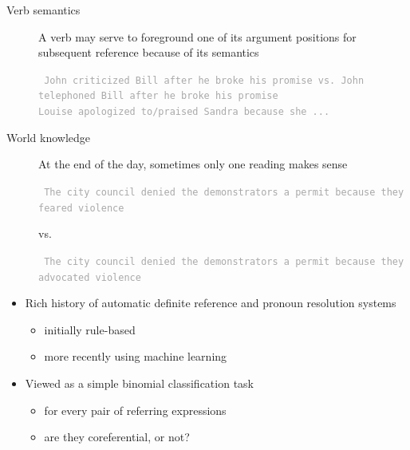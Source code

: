 \documentclass[landscape]{jhuslides3C}
\begin{document}

\vfill
\begin{description}
\item[Verb semantics]
A verb may serve to foreground one of its argument positions for subsequent reference
because of its semantics
\textcolor{darkgrey}{\begin{flushleft} \tt
John criticized Bill after he broke his promise vs. John telephoned Bill after
he broke his promise\\[3mm]
Louise apologized to/praised Sandra because she ...\pause
\end{flushleft}}
\item[World knowledge]
At the end of the day, sometimes only one reading makes sense
\textcolor{darkgrey}{\begin{flushleft} \tt
The city council denied the demonstrators a permit because they feared violence
\end{flushleft}}
vs. 
\textcolor{darkgrey}{\begin{flushleft} \tt
The city council denied the demonstrators a permit because they advocated
violence
\end{flushleft}}
\end{description}
\vfill


\vfill
\begin{itemize}
\item Rich history of automatic definite reference and pronoun resolution systems
\begin{itemize}
\item initially rule-based
\item more recently using machine learning
\end{itemize}
\item Viewed as a simple binomial classification task
\begin{itemize}
\item for every pair of referring expressions
\item are they coreferential, or not?
\end{itemize}
\end{itemize}
\vfill

\end{document}
